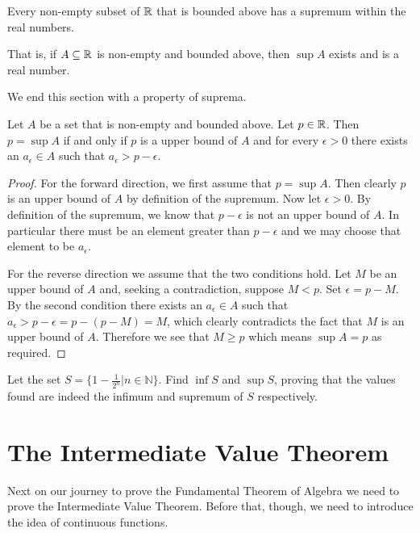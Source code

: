 \begin{axiom}[Completeness]\label{axiom-completeness}
    Every non-empty subset of $\mathbb{R}$ that is bounded above has a supremum within the real numbers.

    That is, if $A \subseteq \mathbb{R}$ is non-empty and bounded above, then $\sup A$ exists and is a real number.
\end{axiom}

We end this section with a property of suprema.
\begin{proposition}\label{prop-identifying-suprema}
    Let $A$ be a set that is non-empty and bounded above. Let $p \in \mathbb{R}$. Then $p = \sup A$ if and only if $p$ is a upper bound of $A$ and for every $\epsilon > 0$ there exists an $a_\epsilon \in A$ such that $a_\epsilon > p - \epsilon$.
\end{proposition}
\begin{proof}
    For the forward direction, we first assume that $p = \sup A$. Then clearly $p$ is an upper bound of $A$ by definition of the supremum. Now let $\epsilon > 0$. By definition of the supremum, we know that $p - \epsilon$ is not an upper bound of $A$. In particular there must be an element greater than $p - \epsilon$ and we may choose that element to be $a_\epsilon$.

    For the reverse direction we assume that the two conditions hold. Let $M$ be an upper bound of $A$ and, seeking a contradiction, suppose $M < p$. Set $\epsilon = p - M$. By the second condition there exists an $a_\epsilon \in A $ such that $a_\epsilon > p - \epsilon = p - (p - M) = M$, which clearly contradicts the fact that $M$ is an upper bound of $A$. Therefore we see that $M \geq p$ which means $\sup A = p$ as required.
\end{proof}

\begin{exercise}
    Let the set $S = \{1 - \frac1{2^n} \vert n \in \mathbb{N}\}$. Find $\inf S$ and $\sup S$, proving that the values found are indeed the infimum and supremum of $S$ respectively.
\end{exercise}

\section{The Intermediate Value Theorem}
Next on our journey to prove the Fundamental Theorem of Algebra we need to prove the Intermediate Value Theorem. Before that, though, we need to introduce the idea of continuous functions.


